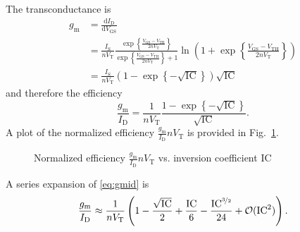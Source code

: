 \documentclass{article}[11pt]
\begin{document}
\bigskip

The transconductance is
\begin{equation}\label{eq:gm}
\begin{split}
 g_{\mathrm{m}}
 &= \frac{\mathrm{d} I_{\mathrm{D}}}{\mathrm{d} V_{\mathrm{GS}}} \\
 &= \frac{I_{\mathrm{S}}}{n V_{\mathrm{T}}} \frac{\exp\left\{\frac{V_{\mathrm{GS}}-V_{\mathrm{TH}}}{2 n V_{\mathrm{T}}}\right\}}{\exp\left\{\frac{V_{\mathrm{GS}}-V_{\mathrm{TH}}}{2 n V_{\mathrm{T}}}\right\}+1} \ln\left(1+\exp\left\{\frac{V_{\mathrm{GS}}-V_{\mathrm{TH}}}{2 n V_{\mathrm{T}}}\right\}\right)\\
 &= \frac{I_{\mathrm{S}}}{n V_{\mathrm{T}}} \left(1-\exp\left\{-\sqrt{\mathrm{IC}}\right\}\right) \sqrt{\mathrm{IC}}
\end{split}
\end{equation}
and therefore the efficiency
\begin{equation}\label{eq:gmid}
\frac{g_{\mathrm{m}}}{I_{\mathrm{D}}} = \frac{1}{n V_{\mathrm{T}}}  \frac{1-\exp\left\{-\sqrt{\mathrm{IC}}\right\}}{\sqrt{\mathrm{IC}}}.
\end{equation}
A plot of the normalized efficiency $\frac{g_{\mathrm{m}}}{I_{\mathrm{D}}} n V_{\mathrm{T}}$
is provided in Fig.~\ref{fig:plot2}.
\begin{figure}[ht]
  \centering
  \caption{Normalized efficiency 
    $\frac{g_{\mathrm{m}}}{I_{\mathrm{D}}} n V_{\mathrm{T}}$ vs. 
    inversion coefficient $\mathrm{IC}$}
  \label{fig:plot2}
\end{figure}
A series expansion of \eqref{eq:gmid} is
\begin{equation}\label{eq:gmid-exp}
\frac{g_{\mathrm{m}}}{I_{\mathrm{D}}} \approx \frac{1}{n V_{\mathrm{T}}} \left(1- \frac{\sqrt\mathrm{IC}}{2} + \frac{\mathrm{IC}}{6} - \frac{\mathrm{IC}^{\nicefrac{3}{2}}}{24} + \mathcal{O}(\mathrm{IC}^2)\right).
\end{equation}
\end{document}

